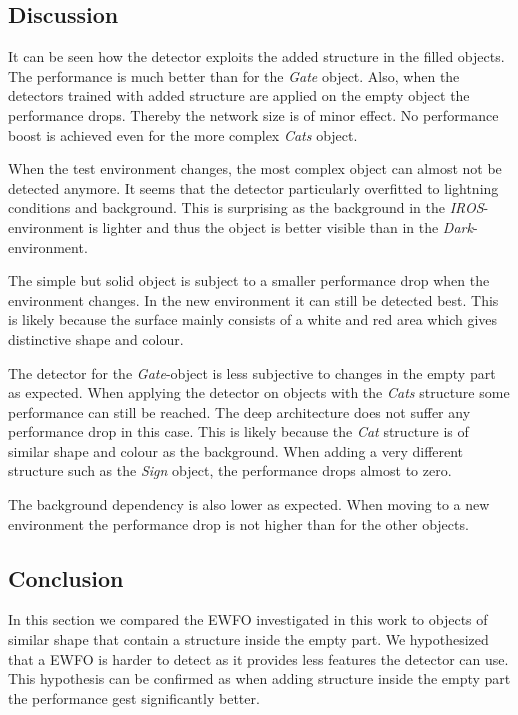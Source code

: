 \subsection{Discussion}

It can be seen how the detector exploits the added structure in the filled objects. The performance is much better than for the \textit{Gate} object. Also, when the detectors trained with added structure are applied on the empty object the performance drops. Thereby the network size is of minor effect. No performance boost is achieved even for the more complex \textit{Cats} object.

When the test environment changes, the most complex object can almost not be detected anymore. It seems that the detector particularly overfitted to lightning conditions and background. This is surprising as the background in the \textit{IROS}-environment is lighter and thus the object is better visible than in the \textit{Dark}-environment.

The simple but solid object is subject to a smaller performance drop when the environment changes. In the new environment it can still be detected best. This is likely because the surface mainly consists of a white and red area which gives distinctive shape and colour.

The detector for the \textit{Gate}-object is less subjective to changes in the empty part as expected. When applying the detector on objects with the \textit{Cats} structure some performance can still be reached. The deep architecture does not suffer any performance drop in this case. This is likely because the \textit{Cat} structure is of similar shape and colour as the background. When adding a very different structure such as the \textit{Sign} object, the performance drops almost to zero.

The background dependency is also lower as expected. When moving to a new environment the performance drop is not higher than for the other objects.


\subsection{Conclusion}

In this section we compared the \ac{EWFO} investigated in this work to objects of similar shape that contain a structure inside the empty part. We hypothesized that a \ac{EWFO} is harder to detect as it provides less features the detector can use. This hypothesis can be confirmed as when adding structure inside the empty part the performance gest significantly better. 

